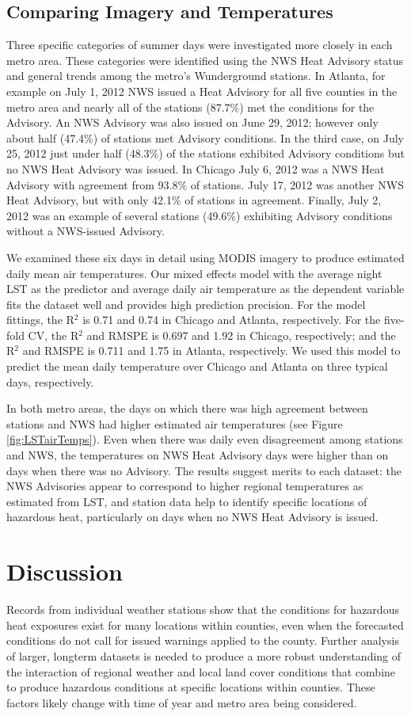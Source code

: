 \documentclass{ametsoc}
\begin{document}
\subsection{Comparing Imagery and Temperatures}\label{subsec:LST}
Three specific categories of summer days were investigated more closely in each metro area. These categories were identified using the NWS Heat Advisory status and general trends among the metro's Wunderground stations. In Atlanta, for example on July 1, 2012 NWS issued a Heat Advisory for all five counties in the metro area and nearly all of the stations (87.7\%) met the conditions for the Advisory. An NWS Advisory was also issued on June 29, 2012; however only about half (47.4\%) of stations met Advisory conditions. In the third case, on July 25, 2012 just under half (48.3\%) of the stations exhibited Advisory conditions but no NWS Heat Advisory was issued. In Chicago July 6, 2012 was a NWS Heat Advisory with agreement from 93.8\% of stations. July 17, 2012 was another NWS Heat Advisory, but with only 42.1\% of stations in agreement. Finally, July 2, 2012 was an example of several stations (49.6\%) exhibiting Advisory conditions without a NWS-issued Advisory. 

We examined these six days in detail using MODIS imagery to produce estimated daily mean air temperatures. Our mixed effects model with the average night LST as the predictor and average daily air temperature as the dependent variable fits the dataset well and provides high prediction precision. For the model fittings, the R$^2$ is 0.71 and 0.74 in Chicago and Atlanta, respectively. For the five-fold CV, the R$^2$ and RMSPE is 0.697 and 1.92 in Chicago, respectively; and the R$^2$ and RMSPE is 0.711 and 1.75 in Atlanta, respectively. We used this model to predict the mean daily temperature over Chicago and Atlanta on three typical days, respectively.  

In both metro areas, the days on which there was high agreement between stations and NWS had higher estimated air temperatures (see Figure \ref{fig:LSTairTemps}). Even when there was daily even disagreement among stations and NWS, the temperatures on NWS Heat Advisory days were higher than on days when there was no Advisory. The results suggest merits to each dataset: the NWS Advisories appear to correspond to higher regional temperatures as estimated from LST, and  station data help to identify specific locations of hazardous heat, particularly on days when no NWS Heat Advisory is issued. 

\section{Discussion}\label{section:discussion}
Records from individual weather stations show that the conditions for hazardous heat exposures exist for many locations within counties, even when the forecasted conditions do not call for issued warnings applied to the county. Further analysis of larger, longterm datasets is needed to produce a more robust understanding of the interaction of regional weather and local land cover conditions that combine to produce hazardous conditions at specific locations within counties. These factors likely change with time of year and metro area being considered. 
\end{document}
